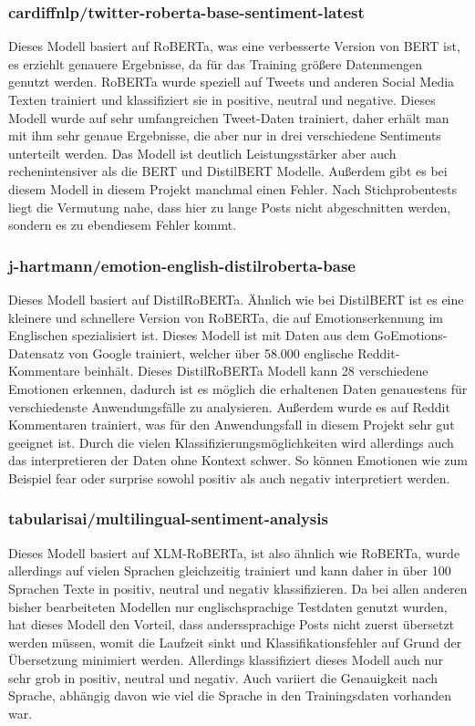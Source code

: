 \subsubsection{cardiffnlp/twitter-roberta-base-sentiment-latest}
Dieses Modell basiert auf RoBERTa, was eine verbesserte Version von BERT ist, es erziehlt genauere Ergebnisse, da für das Training größere Datenmengen genutzt werden. RoBERTa wurde speziell auf Tweets und anderen Social Media Texten trainiert und klassifiziert sie in positive, neutral und negative. Dieses Modell wurde auf sehr umfangreichen Tweet-Daten trainiert, daher erhält man mit ihm sehr genaue Ergebnisse, die aber nur in drei verschiedene Sentiments unterteilt werden. Das Modell ist deutlich Leistungsstärker aber auch rechenintensiver als die BERT und DistilBERT Modelle. Außerdem gibt es bei diesem Modell in diesem Projekt manchmal einen Fehler. Nach Stichprobentests liegt die Vermutung nahe, dass hier zu lange Posts nicht abgeschnitten werden, sondern es zu ebendiesem Fehler kommt.

\subsubsection{j-hartmann/emotion-english-distilroberta-base}
Dieses Modell basiert auf DistilRoBERTa. Ähnlich wie bei DistilBERT ist es eine kleinere und schnellere Version von RoBERTa, die auf Emotionserkennung im Englischen spezialisiert ist. Dieses Modell ist mit Daten aus dem GoEmotions-Datensatz von Google trainiert, welcher über 58.000 englische Reddit-Kommentare beinhält. Dieses DistilRoBERTa Modell kann 28 verschiedene Emotionen erkennen, dadurch ist es möglich die erhaltenen Daten genauestens für verschiedenste Anwendungsfälle zu analysieren. Außerdem wurde es auf Reddit Kommentaren trainiert, was für den Anwendungsfall in diesem Projekt sehr gut geeignet ist. Durch die vielen Klassifizierungsmöglichkeiten wird allerdings auch das interpretieren der Daten ohne Kontext schwer. So können Emotionen wie zum Beispiel fear oder surprise sowohl positiv als auch negativ interpretiert werden.

\subsubsection{tabularisai/multilingual-sentiment-analysis}
Dieses Modell basiert auf XLM-RoBERTa, ist also ähnlich wie RoBERTa, wurde allerdings auf vielen Sprachen gleichzeitig trainiert und kann daher in über 100 Sprachen Texte in positiv, neutral und negativ klassifizieren. Da bei allen anderen bisher bearbeiteten Modellen nur englischsprachige Testdaten genutzt wurden, hat dieses Modell den Vorteil, dass anderssprachige Posts nicht zuerst übersetzt werden müssen, womit die Laufzeit sinkt und Klassifikationsfehler auf Grund der Übersetzung minimiert werden. Allerdings klassifiziert dieses Modell auch nur sehr grob in positiv, neutral und negativ. Auch variiert die Genauigkeit nach Sprache, abhängig davon wie viel die Sprache in den Trainingsdaten vorhanden war.

